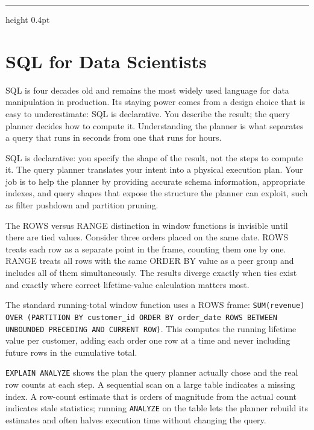 \documentclass[12pt,a4paper]{article}
\begin{document}
\vspace{10pt}\hrule height 0.4pt\vspace{14pt}

\section*{SQL for Data Scientists}

SQL is four decades old and remains the most widely used language for
data manipulation in production. Its staying power comes from a design
choice that is easy to underestimate: SQL is declarative. You describe
the result; the query planner decides how to compute it. Understanding
the planner is what separates a query that runs in seconds from one that
runs for hours.

\begin{concept}
SQL is declarative: you specify the shape of the result, not the steps
to compute it. The query planner translates your intent into a physical
execution plan. Your job is to help the planner by providing accurate
schema information, appropriate indexes, and query shapes that expose
the structure the planner can exploit, such as filter pushdown and
partition pruning.
\end{concept}

\begin{analogy}
The ROWS versus RANGE distinction in window functions is invisible until
there are tied values. Consider three orders placed on the same date.
ROWS treats each row as a separate point in the frame, counting them one
by one. RANGE treats all rows with the same ORDER BY value as a peer
group and includes all of them simultaneously. The results diverge
exactly when ties exist and exactly where correct lifetime-value
calculation matters most.
\end{analogy}

The standard running-total window function uses a ROWS frame:
\texttt{SUM(revenue) OVER (PARTITION BY customer\_id ORDER BY order\_date
ROWS BETWEEN UNBOUNDED PRECEDING AND CURRENT ROW)}. This computes the
running lifetime value per customer, adding each order one row at a time
and never including future rows in the cumulative total.

\begin{mentalmodel}
\texttt{EXPLAIN ANALYZE} shows the plan the query planner actually chose
and the real row counts at each step. A sequential scan on a large table
indicates a missing index. A row-count estimate that is orders of magnitude
from the actual count indicates stale statistics; running
\texttt{ANALYZE} on the table lets the planner rebuild its estimates and
often halves execution time without changing the query.
\end{mentalmodel}
\end{document}
